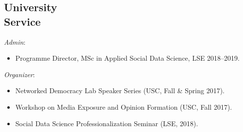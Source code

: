 \documentclass[margin,line,11pt]{resume}
\newcommand{\nl}{\vspace{0.10in}\\}
\begin{document}
\begin{resume}
                \section{\mysidestyle University\\Service}
                
\emph{Admin}: 
\begin{itemize}
\item Programme Director, MSc in Applied Social Data Science, LSE 2018--2019.
\end{itemize}
\emph{Organizer}: 
\begin{itemize}
\item Networked Democracy Lab Speaker Series (USC, Fall \& Spring 2017).
\item Workshop on Media Exposure and Opinion Formation (USC, Fall 2017).
\item Social Data Science Professionalization Seminar (LSE, 2018).
\end{itemize}


    


\end{resume}
\end{document}
